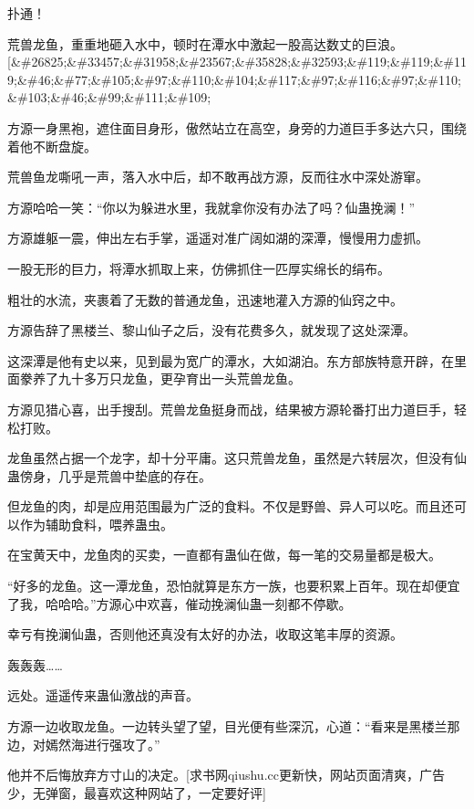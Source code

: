 
\begin{this_body}

扑通！

荒兽龙鱼，重重地砸入水中，顿时在潭水中激起一股高达数丈的巨浪。[\&\#26825;\&\#33457;\&\#31958;\&\#23567;\&\#35828;\&\#32593;\&\#119;\&\#119;\&\#119;\&\#46;\&\#77;\&\#105;\&\#97;\&\#110;\&\#104;\&\#117;\&\#97;\&\#116;\&\#97;\&\#110;\&\#103;\&\#46;\&\#99;\&\#111;\&\#109;

方源一身黑袍，遮住面目身形，傲然站立在高空，身旁的力道巨手多达六只，围绕着他不断盘旋。

荒兽鱼龙嘶吼一声，落入水中后，却不敢再战方源，反而往水中深处游窜。

方源哈哈一笑：“你以为躲进水里，我就拿你没有办法了吗？仙蛊挽澜！”

方源雄躯一震，伸出左右手掌，遥遥对准广阔如湖的深潭，慢慢用力虚抓。

一股无形的巨力，将潭水抓取上来，仿佛抓住一匹厚实绵长的绢布。

粗壮的水流，夹裹着了无数的普通龙鱼，迅速地灌入方源的仙窍之中。

方源告辞了黑楼兰、黎山仙子之后，没有花费多久，就发现了这处深潭。

这深潭是他有史以来，见到最为宽广的潭水，大如湖泊。东方部族特意开辟，在里面豢养了九十多万只龙鱼，更孕育出一头荒兽龙鱼。

方源见猎心喜，出手搜刮。荒兽龙鱼挺身而战，结果被方源轮番打出力道巨手，轻松打败。

龙鱼虽然占据一个龙字，却十分平庸。这只荒兽龙鱼，虽然是六转层次，但没有仙蛊傍身，几乎是荒兽中垫底的存在。

但龙鱼的肉，却是应用范围最为广泛的食料。不仅是野兽、异人可以吃。而且还可以作为辅助食料，喂养蛊虫。

在宝黄天中，龙鱼肉的买卖，一直都有蛊仙在做，每一笔的交易量都是极大。

“好多的龙鱼。这一潭龙鱼，恐怕就算是东方一族，也要积累上百年。现在却便宜了我，哈哈哈。”方源心中欢喜，催动挽澜仙蛊一刻都不停歇。

幸亏有挽澜仙蛊，否则他还真没有太好的办法，收取这笔丰厚的资源。

轰轰轰……

远处。遥遥传来蛊仙激战的声音。

方源一边收取龙鱼。一边转头望了望，目光便有些深沉，心道：“看来是黑楼兰那边，对嫣然海进行强攻了。”

他并不后悔放弃方寸山的决定。[求书网qiushu.cc更新快，网站页面清爽，广告少，无弹窗，最喜欢这种网站了，一定要好评]


\end{this_body}
